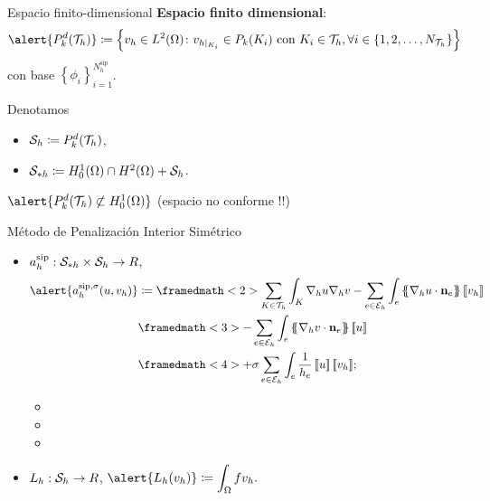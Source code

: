 \begin{frame}{Espacio finito-dimensional}
\textbf{Espacio finito dimensional}:$$\alert{\mathbb{P}_k^d(\T_h)}\coloneqq\left\{v_h\in L^2(\Omega)\colon v_{h|_{K_i}}\in\mathbb{P}_k(K_i)\text{ con } K_i\in\T_h,\forall i\in\left\{1,2,\ldots,N_{\T_h}\right\}\right\}$$ con base $\left\{\phi_i\right\}_{i=1}^{N_h^{\text{sip}}}$.
\vspace*{1cm}

Denotamos
\begin{itemize}\itemsep1em
\item $\S_h\coloneqq\mathbb{P}_k^d(\T_h)$,
\item $\S_{*h}\coloneqq H^1_0(\Omega)\cap H^2(\Omega)+\S_h$.
\end{itemize}
\vspace*{1cm}
\pause
$\alert{\mathbb{P}_k^d(\T_h)\not\subset H_0^1(\Omega)}$ (espacio no conforme \alert{!!})
\end{frame}

\begin{frame}{Método de Penalización Interior Simétrico}
\begin{itemize}\itemsep1em
	\item $a_h^{\text{sip}}:\S_{*h}\times \S_h\to\R$,
	\begin{equation*}
	\label{forma_bilineal_DG}
	\begin{aligned}
	\alert{\asip{u}{v_h}}&\coloneqq \framedmath<2>{\displaystyle \sum_{K\in\T_h}\int_K\nabla_h u\nabla_h v-\sum_{e\in\E_h}\int_e\media{\nabla_h u\cdot\mathbf{n}_e}\salto{v_h}}\\&\framedmath<3>{\displaystyle -\sum_{e\in\E_h}\int_e\media{\nabla_h v\cdot\mathbf{n}_e}\salto{u}}\\&\framedmath<4>{\displaystyle +\sigma\sum_{e\in\E_h}\int_e\frac{1}{h_e}\salto{u}\salto{v_h}};
	\end{aligned}
	\end{equation*}
	\begin{itemize}
		\item<2> 
		\item<3> 
		\item<4> 
	\end{itemize}
	\item $L_h:\S_h\to\R$, $\displaystyle \alert{L_h(v_h)}\coloneqq \int_\Omega f v_h.$
\end{itemize}

\end{frame}

